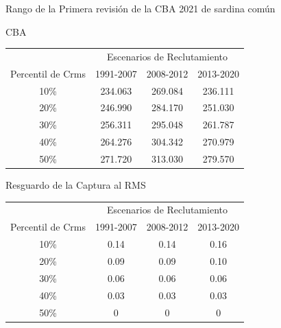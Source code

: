 \documentclass[
  ignorenonframetext,
]{beamer}
\begin{document}
\begin{frame}{Rango de la Primera revisión de la CBA 2021 de sardina
común}
\protect\hypertarget{rango-de-la-primera-revisiuxf3n-de-la-cba-2021-de-sardina-comuxfan}{}
\begin{block}{CBA}
\protect\hypertarget{cba}{}
\begin{table}
    \centering
    \resizebox{7cm}{!} {
    \begin{tabular}{|c|c|c|c|}
    \hline
    &\multicolumn{3}{|c|}{Escenarios de Reclutamiento} \\ 
      Percentil de Crms & 1991-2007 & 2008-2012 & 2013-2020\\ \hline
      10\%              & 234.063   & 269.084    & 236.111\\ 
      20\%              & 246.990   & 284.170    & 251.030\\ 
      30\%              & 256.311   & 295.048    & 261.787\\ 
      40\%              & 264.276   & 304.342    & 270.979\\ 
      50\%              & 271.720   & 313.030    & 279.570\\ \hline
    \end{tabular}}
    \end{table}
\end{block}

\begin{block}{Resguardo de la Captura al RMS}
\protect\hypertarget{resguardo-de-la-captura-al-rms}{}
\begin{table}
    \centering
    \resizebox{7cm}{!} {
    \begin{tabular}{|c|c|c|c|}
    \hline
    &\multicolumn{3}{|c|}{Escenarios de Reclutamiento} \\ 
      Percentil de Crms & 1991-2007 & 2008-2012 &  2013-2020\\ \hline
     10\%               & 0.14     & 0.14      & 0.16 \\ 
     20\%               & 0.09      & 0.09      & 0.10  \\ 
     30\%               & 0.06      & 0.06      & 0.06 \\ 
     40\%               & 0.03      & 0.03      & 0.03 \\ 
     50\%               & 0         & 0         &  0 \\ \hline
    \end{tabular}}
        \end{table}
\end{block}
\end{frame}
\end{document}
